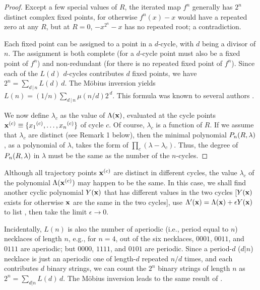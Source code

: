 \documentclass[twocolumn]{revtex4-1}
\begin{document}
\begin{proof}
%
Except a few special values of $R$,
the iterated map $f^{n}$ generally
has $2^n$ distinct complex fixed points,
%
for otherwise $f^{n}(x) - x$ would have a repeated zero at any $R$,
  but at $R=0$, $-x^{2^n} - x$ has no repeated root; a contradiction.


Each fixed point can be assigned to
  a point in a $d$-cycle, with $d$ being a divisor of $n$.
%
The assignment
  is both complete (for a $d$-cycle point
  must also be a fixed point of $f^n$)
  and non-redundant (for there is no
  repeated fixed point of $f^n$).
%
Since each of the $L(d)$ $d$-cycles
  contributes $d$ fixed points,
we have
$2^n = \sum_{d\,|\,n} L(d) \, d$.
%
The M\"obius inversion yields $L(n) = (1/n) \sum_{d\,|\,n} \mu(n/d) 2^{\,d}$.
This formula was known to several authors \cite{hao, lutzky}.

We now define $\lambda_c$ as the value of $\Lambda(\mathbf{x})$,
  evaluated at the cycle points
  $\mathbf{x}^{(c)} \equiv \{ {x_1}^{(c)}, \ldots, {x_n}^{(c)} \}$
  of cycle $c$.
Of course, $\lambda_c$ is a function of $R$.
If we assume that $\lambda_c$ are distinct (see Remark 1 below),
  then the minimal polynomial $P_n(R, \lambda)$,
  as a polynomial of $\lambda$,
  takes the form of $\prod_c (\lambda - \lambda_c)$.
Thus, the degree of $P_n(R, \lambda)$ in $\lambda$
  must be the same as the number of the $n$-cycles.
\end{proof}

\begin{remark}[1]
Although all trajectory points $\mathbf{x}^{(c)}$ are distinct in
  different cycles,
the value $\lambda_c$ of the polynomial $\Lambda(\mathbf{x}^{(c)})$
  may happen to be the same.
In this case,
  we shall find another cyclic polynomial $Y(\mathbf{x})$ that
  has different values in the two cycles
  [$Y(\mathbf{x})$ exists for otherwise $\mathbf{x}$ are the same in the two cycles],
  use $\Lambda'(\mathbf{x}) = \Lambda(\mathbf{x}) + \epsilon Y(\mathbf{x})$
  to list ,
  then take the limit
  $\epsilon \rightarrow 0$.
\end{remark}


\begin{remark}[2]
Incidentally, $L(n)$ is also the number of aperiodic (i.e., period equal to $n$)
  necklaces of length $n$,
  e.g., for $n = 4$,
  out of the six necklaces, $0001$, $0011$, and $0111$ are aperiodic;
  but $0000$, $1111$, and $0101$ are periodic.
%
Since a period-$d$ ($d|n$) necklace is just an aperiodic one
  of length-$d$ repeated $n/d$ times,
and each contributes $d$ binary strings,
we can count the $2^n$ binary strings of length $n$ as
  $2^n = \sum_{d|n} L(d) \, d$.
The M\"obius inversion leads to the same result of .
\end{remark}
\end{document}
